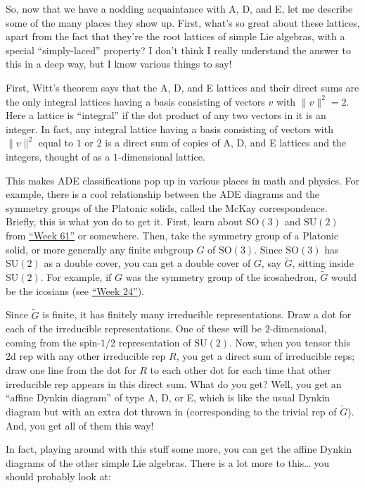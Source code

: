 \documentclass{article}
\begin{document}
So, now that we have a nodding acquaintance with A, D, and E, let me
describe some of the many places they show up. First, what's so great
about these lattices, apart from the fact that they're the root lattices
of simple Lie algebras, with a special ``simply-laced'' property? I
don't think I really understand the answer to this in a deep way, but I
know various things to say!

First, Witt's theorem says that the A, D, and E lattices and their
direct sums are the only integral lattices having a basis consisting of
vectors \(v\) with \(\|v\|^2 = 2\). Here a lattice is ``integral'' if
the dot product of any two vectors in it is an integer. In fact, any
integral lattice having a basis consisting of vectors with \(\|v\|^2\)
equal to \(1\) or \(2\) is a direct sum of copies of A, D, and E
lattices and the integers, thought of as a \(1\)-dimensional lattice.

This makes ADE classifications pop up in various places in math and
physics. For example, there is a cool relationship between the ADE
diagrams and the symmetry groups of the Platonic solids, called the
McKay correspondence. Briefly, this is what you do to get it. First,
learn about \(\mathrm{SO}(3)\) and \(\mathrm{SU}(2)\) from
\protect\hyperlink{week61}{``Week 61''} or somewhere. Then, take the
symmetry group of a Platonic solid, or more generally any finite
subgroup \(G\) of \(\mathrm{SO}(3)\). Since \(\mathrm{SO}(3)\) has
\(\mathrm{SU}(2)\) as a double cover, you can get a double cover of
\(G\), say \(\widetilde{G}\), sitting inside \(\mathrm{SU}(2)\). For
example, if \(G\) was the symmetry group of the icosahedron,
\(\widetilde{G}\) would be the icosians (see
\protect\hyperlink{week24}{``Week 24''}).

Since \(\widetilde{G}\) is finite, it has finitely many irreducible
representations. Draw a dot for each of the irreducible representations.
One of these will be \(2\)-dimensional, coming from the spin-\(1/2\)
representation of \(\mathrm{SU}(2)\). Now, when you tensor this 2d rep
with any other irreducible rep \(R\), you get a direct sum of
irreducible reps; draw one line from the dot for \(R\) to each other dot
for each time that other irreducible rep appears in this direct sum.
What do you get? Well, you get an ``affine Dynkin diagram'' of type A,
D, or E, which is like the usual Dynkin diagram but with an extra dot
thrown in (corresponding to the trivial rep of \(\widetilde{G}\)). And,
you get all of them this way!

In fact, playing around with this stuff some more, you can get the
affine Dynkin diagrams of the other simple Lie algebras. There is a lot
more to this\ldots{} you should probably look at:
\end{document}
